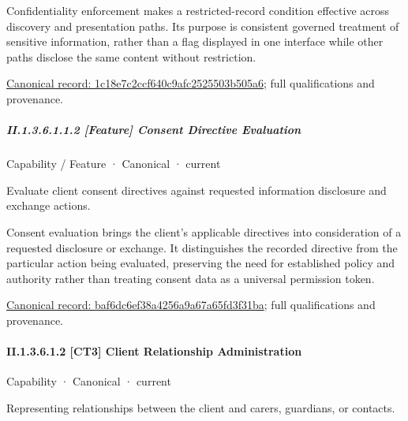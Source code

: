 Confidentiality enforcement makes a restricted-record condition effective across discovery and presentation paths. Its purpose is consistent governed treatment of sensitive information, rather than a flag displayed in one interface while other paths disclose the same content without restriction.


{\footnotesize \href{../../../../continuum/strategy/capability/feature/1c18e7c2ccf640c9afc2525503b505a6.md}{Canonical record: 1c18e7c2ccf640c9afc2525503b505a6}; full qualifications and provenance.}\par
\subparagraph*{II.1.3.6.1.1.2 [Feature] Consent Directive Evaluation}
\label{navigation:II.1.3.6.1.1.2}

\label{element:baf6dc6ef38a4256a9a67a65fd3f31ba}
{\small Capability / Feature · Canonical · current}\par

Evaluate client consent directives against requested information disclosure and exchange actions.



Consent evaluation brings the client's applicable directives into consideration of a requested disclosure or exchange. It distinguishes the recorded directive from the particular action being evaluated, preserving the need for established policy and authority rather than treating consent data as a universal permission token.


{\footnotesize \href{../../../../continuum/strategy/capability/feature/baf6dc6ef38a4256a9a67a65fd3f31ba.md}{Canonical record: baf6dc6ef38a4256a9a67a65fd3f31ba}; full qualifications and provenance.}\par
\paragraph*{II.1.3.6.1.2 [CT3] Client Relationship Administration}
\label{navigation:II.1.3.6.1.2}

\label{element:d682c11d3eb04770b1f20be478fd475e}
{\small Capability · Canonical · current}\par

Representing relationships between the client and carers, guardians, or contacts.



